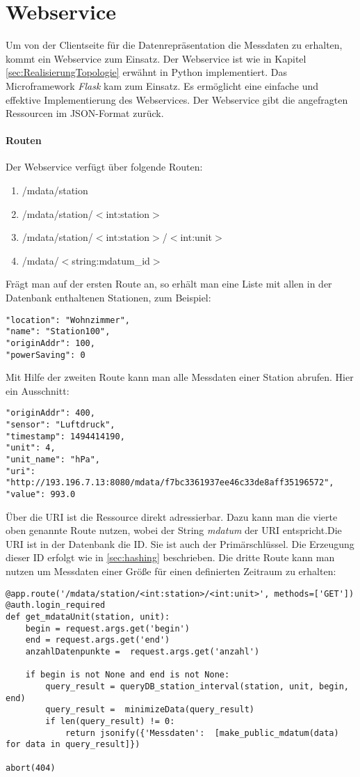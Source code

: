 \section{Webservice}
\label{sec:webservice}
Um von der Clientseite für die Datenrepräsentation die Messdaten zu erhalten, kommt ein Webservice zum Einsatz. Der Webservice ist wie in Kapitel \ref{sec:RealisierungTopologie} erwähnt in Python implementiert. Das Microframework \textit{Flask} kam zum Einsatz. Es ermöglicht eine einfache und effektive Implementierung des Webservices. Der Webservice gibt die angefragten Ressourcen im JSON-Format zurück. 

\paragraph{Routen}
Der Webservice verfügt über folgende Routen: 
\begin{enumerate}
\item /mdata/station
\item /mdata/station/$<$int:station$>$
\item /mdata/station/$<$int:station$>$/$<$int:unit$>$
\item /mdata/$<$string:mdatum\_id$>$
\end{enumerate} 
Frägt man auf der ersten Route an, so erhält man eine Liste mit allen in der Datenbank enthaltenen Stationen, zum Beispiel:
\lstset{language=c, numbers=none, breaklines=true}
\begin{lstlisting}
"location": "Wohnzimmer", 
"name": "Station100", 
"originAddr": 100, 
"powerSaving": 0
\end{lstlisting}
Mit Hilfe der zweiten Route kann man alle Messdaten einer Station abrufen. Hier ein Ausschnitt:
\lstset{language=c, numbers=none, breaklines=true}
\begin{lstlisting}
"originAddr": 400, 
"sensor": "Luftdruck", 
"timestamp": 1494414190, 
"unit": 4, 
"unit_name": "hPa", 
"uri": "http://193.196.7.13:8080/mdata/f7bc3361937ee46c33de8aff35196572", 
"value": 993.0
\end{lstlisting}
Über die URI ist die Ressource direkt adressierbar. Dazu kann man die vierte oben genannte Route nutzen, wobei der String \textit{mdatum} der URI entspricht.Die URI ist in der Datenbank die ID. Sie ist auch der Primärschlüssel. Die Erzeugung dieser ID erfolgt wie in \ref{sec:hashing} beschrieben. 
Die dritte Route kann man nutzen um Messdaten einer Größe für einen definierten Zeitraum zu erhalten:
\lstset{language=python, numbers=left, breaklines=true}
\begin{lstlisting}
@app.route('/mdata/station/<int:station>/<int:unit>', methods=['GET'])
@auth.login_required
def get_mdataUnit(station, unit):
    begin = request.args.get('begin')
    end = request.args.get('end')
    anzahlDatenpunkte =  request.args.get('anzahl')

    if begin is not None and end is not None:
        query_result = queryDB_station_interval(station, unit, begin, end)
        query_result =  minimizeData(query_result)
        if len(query_result) != 0:
            return jsonify({'Messdaten':  [make_public_mdatum(data) for data in query_result]})

abort(404)
\end{lstlisting} 
